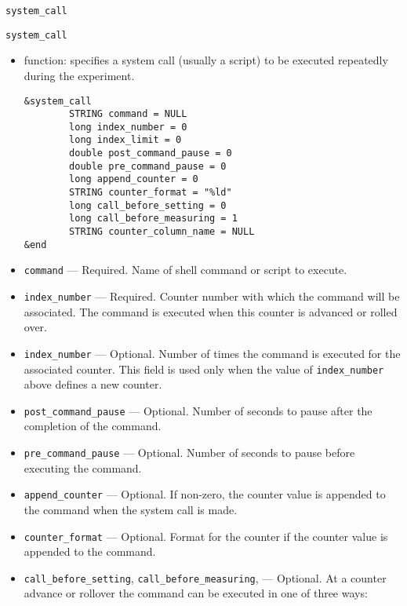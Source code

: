 \begin{itemize}
\begin{itemize}
\begin{latexonly}
\newpage\begin{center}{\Large \verb+system_call+}\end{center}
\end{latexonly}
\begin{htmlonly}
\item {\Large \verb+system_call+}
\end{htmlonly}
\begin{itemize}
   \item function: specifies a system call (usually a script) to be executed repeatedly during the experiment.
\begin{verbatim}
&system_call
        STRING command = NULL
        long index_number = 0
        long index_limit = 0
        double post_command_pause = 0
        double pre_command_pause = 0
        long append_counter = 0
        STRING counter_format = "%ld"
        long call_before_setting = 0
        long call_before_measuring = 1
        STRING counter_column_name = NULL 
&end       
\end{verbatim}
   \item {\verb+command+} --- Required. Name of shell command or script to execute.
   \item {\verb+index_number+} --- Required. Counter number with which the command will be associated. The command is executed
                when this counter is advanced or rolled over.
   \item {\verb+index_number+} --- Optional. Number of times the command is executed for 
                the associated counter. This field is used only when the value of {\verb+index_number+} above defines a new counter.
   \item {\verb+post_command_pause+} --- Optional. Number of seconds to pause after the completion of the command.
   \item {\verb+pre_command_pause+} --- Optional. Number of seconds to pause before executing the command.
   \item {\verb+append_counter+} --- Optional. If non-zero, the counter value is appended to the command when the
                system call is made.
   \item {\verb+counter_format+} --- Optional. Format for the counter if the counter value is appended to the command.
   \item {\verb+call_before_setting+}, {\verb+call_before_measuring+}, --- Optional.
                At a counter advance or rollover
                the command can be executed in one of three ways:

\end{itemize}
\end{itemize}
\end{itemize}
